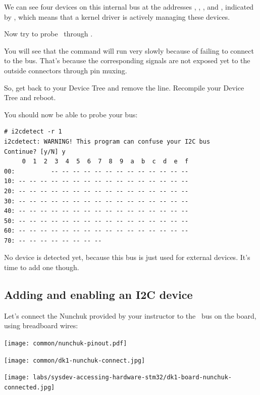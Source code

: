       We can see four devices on this internal bus at the addresses , , , and , indicated by ,
      which means that a kernel driver is actively managing these devices.
\fi

Now try to probe \busname\ through .

You will see that the command will run very slowly because of failing to
connect to the bus. That's because the corresponding signals are
not exposed yet to the outside connectors through pin muxing.

So, get back to your Device Tree and remove the 
line. Recompile your Device Tree and reboot.

You should now be able to probe your bus:

\begin{verbatim}
# i2cdetect -r 1
i2cdetect: WARNING! This program can confuse your I2C bus
Continue? [y/N] y
     0  1  2  3  4  5  6  7  8  9  a  b  c  d  e  f
00:          -- -- -- -- -- -- -- -- -- -- -- -- --
10: -- -- -- -- -- -- -- -- -- -- -- -- -- -- -- --
20: -- -- -- -- -- -- -- -- -- -- -- -- -- -- -- --
30: -- -- -- -- -- -- -- -- -- -- -- -- -- -- -- --
40: -- -- -- -- -- -- -- -- -- -- -- -- -- -- -- --
50: -- -- -- -- -- -- -- -- -- -- -- -- -- -- -- --
60: -- -- -- -- -- -- -- -- -- -- -- -- -- -- -- --
70: -- -- -- -- -- -- -- --
\end{verbatim}

No device is detected yet, because this bus is just
used for external devices. It's time to add one though.

\subsection{Adding and enabling an I2C device}

Let's connect the Nunchuk provided by your instructor
to the \busname\ bus on the board, using breadboard wires:

\begin{center}
\texttt{[image: common/nunchuk-pinout.pdf]}
\end{center}

\if{}
      \texttt{[image: common/dk1-nunchuk-connect.jpg]}
      \begin{center}
      \texttt{[image: labs/sysdev-accessing-hardware-stm32/dk1-board-nunchuk-connected.jpg]}
      \end{center}

